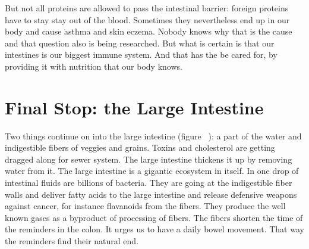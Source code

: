 \documentclass[../main.tex]{subfiles}
\begin{document}
But not all proteins are allowed to pass the intestinal barrier: foreign proteins have to stay stay out of the blood.
Sometimes they nevertheless end up in our body and cause asthma and skin eczema.
Nobody knows why that is the cause and that question also is being researched.
But what is certain is that our intestines is our biggest immune system.
And that has the be cared for, by providing it with nutrition that our body knows.

\section{Final Stop: the Large Intestine}

Two things continue on into the large intestine (figure~%
): a part of the water and indigestible fibers of veggies and grains. 
Toxins and cholesterol are getting dragged along for sewer system.
The large intestine thickens it up by removing water from it.
The large intestine is a gigantic ecosystem in itself.
In one drop of intestinal fluids are billions of bacteria.
They are going at the indigestible fiber walls and deliver fatty acids to the large intestine
and release defensive weapons against cancer, for instance flavanoids from the fibers.
They produce the well known gases as a byproduct of processing of fibers.
The fibers shorten the time of the reminders in the colon.
It urges us to have a daily bowel movement.
That way the reminders find their natural end.






\end{document}
